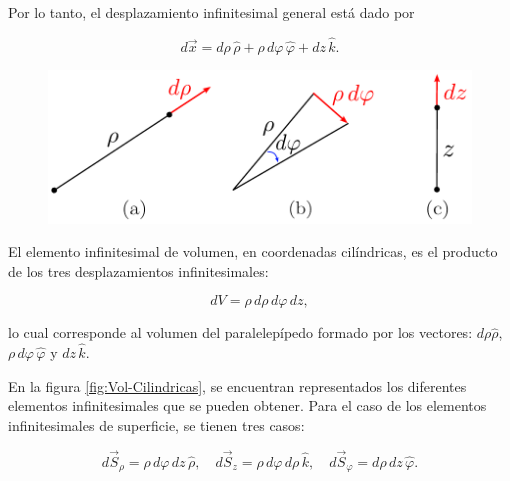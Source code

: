 Por lo tanto, el desplazamiento infinitesimal general está dado por
\begin{shaded}
    $$d\Vec{x} = d\rho \, \hat{\rho} + \rho \,d\varphi \,\hat{\varphi} + dz \,\hat{k}.$$
\end{shaded}

\begin{figure}[H]
    \centering
    \includegraphics[scale = 0.7]{Figuras/Elemento-Cilindrica.pdf}
    \caption{}
    \label{fig:Elemento-Cilindrica}
\end{figure}

El elemento infinitesimal de volumen, en coordenadas cilíndricas, es el producto de los tres desplazamientos infinitesimales:
\begin{shaded}
    $$dV = \rho \,d\rho\,d\varphi\,dz,$$
\end{shaded}

lo cual corresponde al volumen del paralelepípedo formado por los vectores: $d\rho \hat{\rho}$, $\rho \,d\varphi \, \hat{\varphi}$ y $dz \, \hat{k}$.

 En la figura \ref{fig:Vol-Cilindricas}, se encuentran representados los diferentes elementos infinitesimales que se pueden obtener. Para el caso de los elementos infinitesimales  de superficie, se tienen tres casos:
\begin{shaded}
\begin{equation*}
d\vec{S}_{\rho} = \rho \,d\varphi \,dz \,\hat{\rho},\quad d\vec{S}_{z} = \rho \,d\varphi\, d\rho \,\hat{k},\quad d\vec{S}_{\varphi} = d\rho\, dz \,\hat{\varphi}.
\end{equation*}  
\end{shaded}

